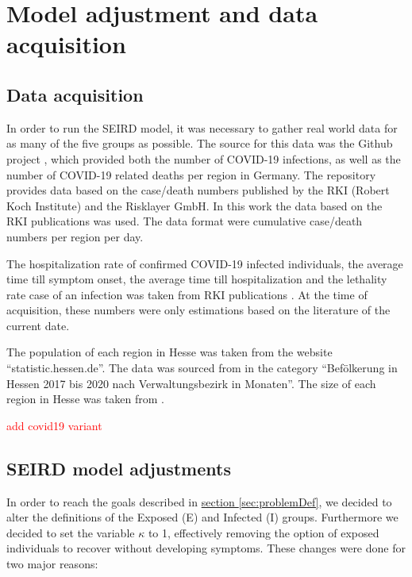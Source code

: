 \section{Model adjustment and data acquisition}


\subsection{Data acquisition}
\label{sec:datacoll}
In order to run the SEIRD model, it was necessary to gather real world data for as many of the five groups as possible.
The source for this data was the Github project \cite{Gehrcke}, which provided both the number of COVID-19 infections,
as well as the number of COVID-19 related deaths per region in Germany. The repository provides data based on the case/death
numbers published by the RKI (Robert Koch Institute) and the Risklayer GmbH. In this work the data based on the RKI publications
was used. The data format were cumulative case/death numbers per region per day.\newline

\par
The hospitalization rate of confirmed COVID-19 infected individuals, the average time till symptom onset, the average time till
hospitalization and the lethality rate case of an infection was taken from RKI publications \cite{RKIcov}. At the time of acquisition, these
numbers were only estimations based on the literature of the current date.\newline

\par
The population of each region in Hesse was taken from the website ``statistic.hessen.de''. The data was sourced from \cite{HessePop}
in the category ``Bef\"olkerung in Hessen 2017 bis 2020 nach Verwaltungsbezirk in Monaten''. The size of each region in Hesse
was taken from \cite{HesseSize}.


\textcolor{red}{add covid19 variant}

\subsection{SEIRD model adjustments}
\label{sec:SEIRDredef}
In order to reach the goals described in \hyperref[sec:problemDef]{section \ref*{sec:problemDef}}, we decided to alter
the definitions of the Exposed (E) and Infected (I) groups. Furthermore we decided to set the variable
$\kappa$ to 1, effectively removing the option of exposed individuals to recover without developing symptoms. These
changes were done for two major reasons:\newline

